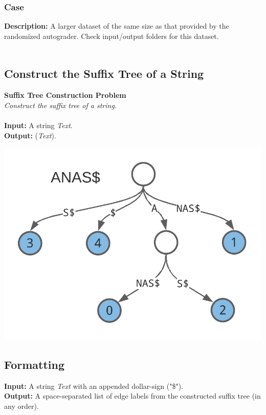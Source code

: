 \documentclass{article}
\renewcommand{\sc}[1]{\text{\scshape #1}}
\begin{document}
\subsubsection*{Case }
\hline \vspace{5}
\textbf{Description:} A larger dataset of the same size as that provided by the randomized autograder. Check input/output folders for this dataset.\\ \\
\pagebreak
\subsection{Construct the Suffix Tree of a String}
\hline\vspace{5}
\textbf{Suffix Tree Construction Problem}\\
\emph{Construct the suffix tree of a string.}\\ \\
\textbf{Input:} A string \emph{Text}.\\
\textbf{Output:} \sc{SuffixTree}(\emph{Text}).
\begin{center}
    \includegraphics[scale=0.2]{c9/logos/9C.png} 
\end{center}
\hline\vspace{5}

\subsection*{Formatting}
\noindent\textbf{Input:} A string \emph{Text} with an appended dollar-sign ("\$").\\
\noindent\textbf{Output:} A space-separated list of edge labels from the constructed suffix tree (in any order).
\end{document}
